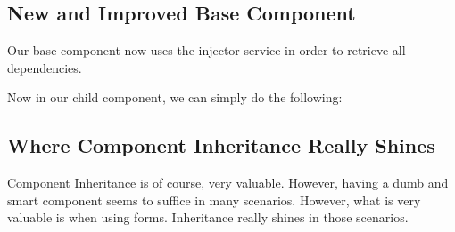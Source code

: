 \subsection{ New and Improved Base Component }
Our base component now uses the injector service in order to retrieve all
dependencies. 



Now in our child component, we can simply do the following:



\subsection{ Where Component Inheritance Really Shines }
Component Inheritance is of course, very valuable. However, having a dumb and
smart component seems to suffice in many scenarios. However, what is very
valuable is when using forms. Inheritance really shines in those scenarios. 
